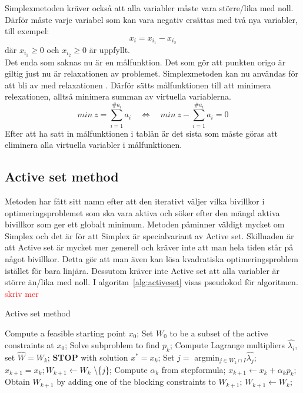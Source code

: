 Simplexmetoden kräver också att alla variabler måste vara större/lika med noll. Därför måste varje variabel som kan vara negativ ersättas med två nya variabler, till exempel:
$$x_i = x_{i_1} - x_{i_2}$$
där $x_{i_1}\geq 0$ och $x_{i_2}\geq 0$ är uppfyllt. \\
Det enda som saknas nu är en målfunktion. Det som gör att punkten origo är giltig just nu är relaxationen av problemet. Simplexmetoden kan nu användas för att bli av med relaxationen . Därför sätts målfunktionen till att minimera relexationen, alltså minimera summan av virtuella variablerna.
$$min \: z = \sum^{\#a_i}_{i=1} {a_i} \quad  \Leftrightarrow \quad min \: z - \sum^{\#a_i}_{i=1} {a_i} = 0$$
Efter att ha satt in målfunktionen i tablån är det sista som måste göras att eliminera alla virtuella variabler i målfunktionen. \citep{numericaloptimization}

\subsection{Active set method}   
Metoden har fått sitt namn efter att den iterativt väljer vilka bivillkor i optimeringsproblemet som ska vara aktiva och söker efter den mängd aktiva bivillkor som ger ett globalt minimum. Metoden påminner väldigt mycket om Simplex och det är för att Simplex är specialvariant av Active set. Skillnaden är att Active set är mycket mer generell och kräver inte att man hela tiden står på något bivillkor. Detta gör att man även kan lösa kvadratiska optimeringsproblem istället för bara linjära. Dessutom kräver inte Active set att alla variabler är större än/lika med noll. I algoritm~\ref{alg:activeset} visas pseudokod för algoritmen. 
\citep{numericaloptimization}
\textcolor{red}{skriv mer}

\begin{algorithm}[H]
\caption{Active set method}
\label{alg:activeset}
\begin{algorithmic}
\State Compute a feasible starting point $x_0$;
\State Set $W_0$ to be a subset of the active constraints at $x_0$;
	\State Solve subproblem to find $p_k$;
		\State Compute Lagrange multipliers $\hat{\lambda_i}$,
		\State set $\hat{W} = W_k$; 
			\State \textbf{STOP} with solution $x^* = x_k$;
		\Else
			\State Set $j =$ argmin$_{j \in W_k \cap I}\hat{\lambda_j}$;
			\State $x_{k+1} = x_k; W_{k+1} \gets W_k$ \textbackslash \{$j$\};		
		\EndIf
	\Else		
		\State Compute $\alpha_k$ from stepformula;
		\State $x_{k+1} \gets x_k + \alpha_k p_k$;
			\State Obtain $W_{k+1}$ by adding one of the blocking constraints to $W_{k+1}$;
		\Else
			\State $W_{k+1} \gets W_k$;	
		\EndIf 	
	\EndIf
\EndFor 
\EndProcedure
\end{algorithmic}
\end{algorithm}

